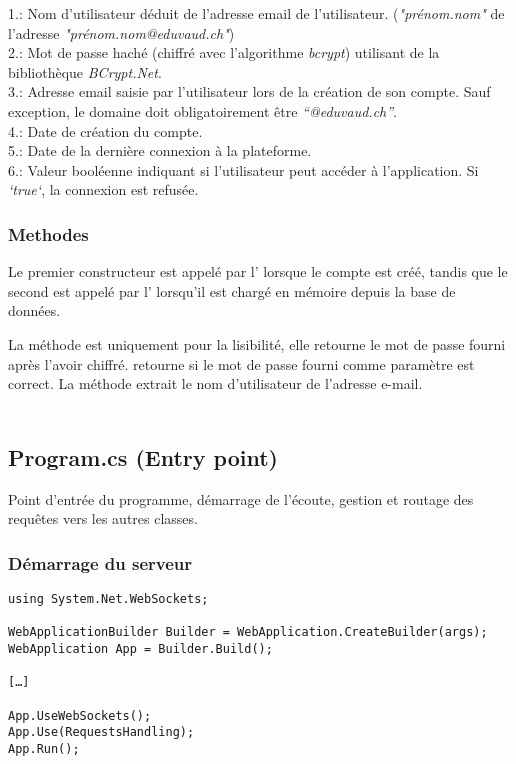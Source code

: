 \documentclass{article}
\begin{document}
1.: Nom d'utilisateur déduit de l'adresse email de l'utilisateur. (\textit{"prénom.nom"} de l'adresse \textit{"prénom.nom@eduvaud.ch"}) \\
2.: Mot de passe haché (chiffré avec l'algorithme \textit{bcrypt}) utilisant  de la bibliothèque \textit{BCrypt.Net}. \\
3.: Adresse email saisie par l'utilisateur lors de la création de son compte. Sauf exception, le domaine doit obligatoirement être \textit{“@eduvaud.ch”}. \\
4.: Date de création du compte. \\
5.: Date de la dernière connexion à la plateforme.\\
6.: Valeur booléenne indiquant si l'utilisateur peut accéder à l'application. Si \textit{`true`}, la connexion est refusée. \\

\subsubsection{Methodes}
Le premier constructeur est appelé par l’ lorsque le compte est créé, tandis que le second est appelé par l’ lorsqu'il est chargé en mémoire depuis la base de données. 

La méthode  est uniquement pour la lisibilité, elle retourne le mot de passe fourni après l'avoir chiffré.  retourne si le mot de passe fourni comme paramètre  est correct. La méthode  extrait le nom d'utilisateur de l'adresse e-mail.
\\\\

\subsection{Program.cs (Entry point)}

Point d'entrée du programme, démarrage de l'écoute, gestion et routage des requêtes vers les autres classes.

\subsubsection{Démarrage du serveur}
\begin{verbatim}
using System.Net.WebSockets;

WebApplicationBuilder Builder = WebApplication.CreateBuilder(args);
WebApplication App = Builder.Build();

[…]

App.UseWebSockets();
App.Use(RequestsHandling);
App.Run();
\end{verbatim}
\end{document}
